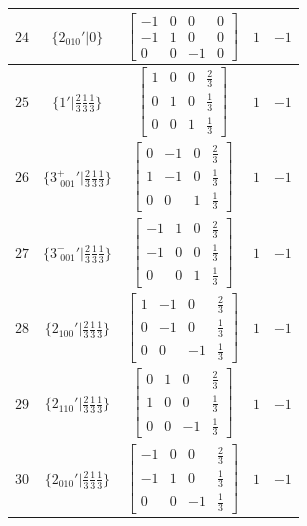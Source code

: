 \documentclass[fleqn,8pt]{jsarticle}
\begin{document}
\begin{longtable}{ccccc}
$ 24 $ & $ \{2{}_{010}{}'|0\} $ & $ \begin{bmatrix} -1 & 0 & 0 & 0 \\ -1 & 1 & 0 & 0 \\ 0 & 0 & -1 & 0 \end{bmatrix} $ & $ 1 $ & $ -1 $ \\ \hline
$ 25 $ & $ \{1{}'|\frac{2}{3} \frac{1}{3} \frac{1}{3}\} $ & $ \begin{bmatrix} 1 & 0 & 0 & \frac{2}{3} \\ 0 & 1 & 0 & \frac{1}{3} \\ 0 & 0 & 1 & \frac{1}{3} \end{bmatrix} $ & $ 1 $ & $ -1 $ \\ \hline
$ 26 $ & $ \{3^{+}_{\,\,001}{}'|\frac{2}{3} \frac{1}{3} \frac{1}{3}\} $ & $ \begin{bmatrix} 0 & -1 & 0 & \frac{2}{3} \\ 1 & -1 & 0 & \frac{1}{3} \\ 0 & 0 & 1 & \frac{1}{3} \end{bmatrix} $ & $ 1 $ & $ -1 $ \\ \hline
$ 27 $ & $ \{3^{-}_{\,\,001}{}'|\frac{2}{3} \frac{1}{3} \frac{1}{3}\} $ & $ \begin{bmatrix} -1 & 1 & 0 & \frac{2}{3} \\ -1 & 0 & 0 & \frac{1}{3} \\ 0 & 0 & 1 & \frac{1}{3} \end{bmatrix} $ & $ 1 $ & $ -1 $ \\ \hline
$ 28 $ & $ \{2{}_{100}{}'|\frac{2}{3} \frac{1}{3} \frac{1}{3}\} $ & $ \begin{bmatrix} 1 & -1 & 0 & \frac{2}{3} \\ 0 & -1 & 0 & \frac{1}{3} \\ 0 & 0 & -1 & \frac{1}{3} \end{bmatrix} $ & $ 1 $ & $ -1 $ \\ \hline
$ 29 $ & $ \{2{}_{110}{}'|\frac{2}{3} \frac{1}{3} \frac{1}{3}\} $ & $ \begin{bmatrix} 0 & 1 & 0 & \frac{2}{3} \\ 1 & 0 & 0 & \frac{1}{3} \\ 0 & 0 & -1 & \frac{1}{3} \end{bmatrix} $ & $ 1 $ & $ -1 $ \\ \hline
$ 30 $ & $ \{2{}_{010}{}'|\frac{2}{3} \frac{1}{3} \frac{1}{3}\} $ & $ \begin{bmatrix} -1 & 0 & 0 & \frac{2}{3} \\ -1 & 1 & 0 & \frac{1}{3} \\ 0 & 0 & -1 & \frac{1}{3} \end{bmatrix} $ & $ 1 $ & $ -1 $ \\ \hline

\end{longtable}
\end{document}
